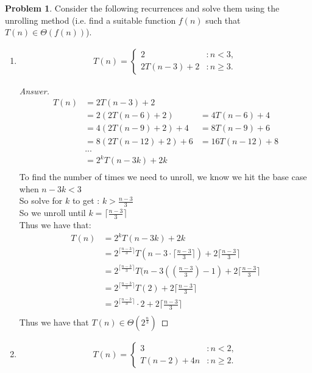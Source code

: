 \documentclass[11pt]{article}
\theoremstyle{definition}
\theoremstyle{definition}
\newtheorem{required}{Problem}
\theoremstyle{definition}
\begin{document}
\begin{required} \label{Unrolling1}
Consider the following recurrences and solve them using the unrolling method (i.e. find a suitable function $f(n)$ such that $T(n) \in \Theta(f(n))$). 
\begin{enumerate} [label=(\alph*)]
    \item 
\begin{align*}
T(n) = \begin{cases}
2 & : n < 3, \\
2T(n - 3) + 2 & : n \geq 3.
\end{cases}
\end{align*}

\begin{proof}[Answer]
\begin{align*}
T(n) &= 2T(n-3)+2 \\
&= 2(2T(n-6) +2) &= 4T(n-6)+4 \\
&=4(2T(n-9)+2)+4 &= 8T(n-9)+6\\
&=8(2T(n-12)+2)+6 &= 16T(n-12)+8\\
&... \\
						&=2^kT(n-3k)+2k\\
\end{align*}
To find the number of times we need to unroll, we know we hit the base case when $n-3k <3$\\
So solve for $k$ to get : $k>\frac{n-3}{3}$\\
So we unroll until $k = \lceil\frac{n-3}{3} \rceil$ \\
Thus we have that: \\
\begin{align*}
T(n) &= 2^kT(n-3k)+2k\\
&=2^{ \lceil \frac{n-3}{3} \rceil}T(n-3\cdot  \lceil \frac{n-3}{3} \rceil) + 2 \lceil\frac{n-3}{3} \rceil \\
&=2^{ \lceil \frac{n-3}{3} \rceil}T(n-3((\frac{n-3}{3}) -1) + 2 \lceil \frac{n-3}{3} \rceil \\
&=2^{ \lceil \frac{n-3}{3} \rceil}T(2) + 2 \lceil \frac{n-3}{3} \rceil \\
&=2^{\lceil\frac{n-3}{3} \rceil}\cdot 2 + 2 \lceil \frac{n-3}{3}\rceil \\
\end{align*}
Thus we have that $T(n) \in \Theta(2^\frac{n}{3})$



\end{proof}

\newpage
\item
\begin{align*}
T(n) = \begin{cases}
3 & : n < 2, \\
T(n-2) + 4n & : n \geq 2.
\end{cases}
\end{align*}


\end{enumerate}
\end{required}
\end{document}
